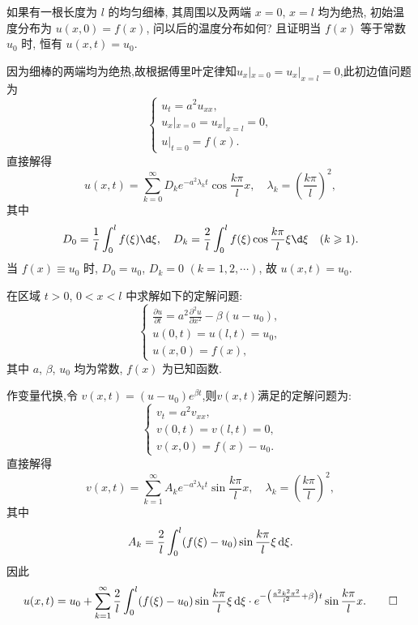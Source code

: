 \begin{exercise}
  如果有一根长度为 $l$ 的均匀细棒, 其周围以及两端 $x=0$, $x=l$
  均为绝热, 初始温度分布为 $u(x,0)=f(x)$, 问以后的温度分布如何?
  且证明当 $f(x)$ 等于常数 $u_0$ 时, 恒有 $u(x,t)=u_0$.
\end{exercise}

\begin{solution}
  因为细棒的两端均为绝热,故根据傅里叶定律知$u_x|_{x=0}=u_x|_{x=l}=0$,此初边值问题为
  \[\begin{cases}
    u_t = a^2u_{xx}, \\
    u_x|_{x=0} = u_x|_{x=l} = 0, \\
    u|_{t=0} = f(x).
  \end{cases}\]
  直接解得
  \[ u(x,t)=\sum_{k=0}^{\infty}D_ke^{-a^2\lambda_kt}\cos\frac{k\pi}{l}x,
    \quad \lambda_k=\left(\frac{k\pi}{l}\right)^2, \]
  其中
  \[ D_0 = \frac{1}{l}\int_0^lf(\xi) \d\xi,
    \quad D_k=\frac{2}{l}\int_0^lf(\xi)\cos\frac{k\pi}{l}\xi \d\xi
    \quad (k\geq1).\]
  当 $f(x)\equiv u_0$ 时, $D_0=u_0$, $D_k=0$ $(k=1,2,\cdots)$, 故 $ u(x,t)=u_0$.
\end{solution}


\begin{exercise}
  在区域 $t>0$, $0<x<l$ 中求解如下的定解问题:
  \[\begin{cases}
    \frac{\partial u}{\partial t} = a^2 \frac{\partial^2u}{\partial x^2} - \beta(u-u_0), \\
    u(0,t) = u(l,t) = u_0, \\
    u(x,0) = f(x),
  \end{cases}\]
  其中 $a$, $\beta$, $u_0$ 均为常数, $f(x)$ 为已知函数.
\end{exercise}

\begin{solution}
  作变量代换,令 $v(x,t)=(u-u_0)e^{\beta t}$,则$v(x,t)$满足的定解问题为:
  \[\begin{cases}
    v_t=a^2v_{xx}, \\
    v(0,t)=v(l,t)=0, \\
    v(x,0)=f(x)-u_0.
  \end{cases}\]
  直接解得
  \[ v(x,t) = \sum_{k=1}^{\infty}A_ke^{-a^2\lambda_kt}\sin\frac{k\pi}{l}x,
    \quad \lambda_k = \left(\frac{k\pi}{l}\right)^2, \]
  其中
  \[ A_k = \frac{2}{l}\int_0^l(f(\xi)-u_0)\sin\frac{k\pi}{l}\xi\mathop{}\!\mathrm{d}\xi. \]
  因此
  \[u(x,t) = u_0 + \sum_{k=1}^{\infty}\frac{2}{l}
    \int_0^l(f(\xi)-u_0)\sin\frac{k\pi}{l}\xi\mathop{}\!\mathrm{d}\xi
      \cdot e^{-\left(\frac{a^2k^2\pi^2}{l^2}+\beta\right)t}\sin\frac{k\pi}{l}x. \qedhere \]
\end{solution}


